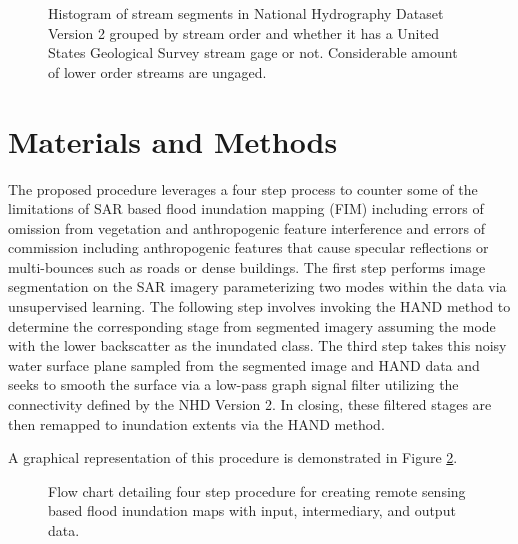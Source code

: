 \documentclass{article}
\begin{document}
\begin{figure}[htb]

\begin{minipage}[b]{1.0\linewidth}
  \centering
 \centerline{}
\end{minipage}

\caption{Histogram of stream segments in National Hydrography Dataset Version 2 grouped by stream order and whether it has a United States Geological Survey stream gage or not. Considerable amount of lower order streams are ungaged.}
\label{fig:histogram_gages}

\end{figure}

\section{Materials and Methods}
\label{sec:materials_and_methods}

The proposed procedure leverages a four step process to counter some of the limitations of SAR based flood inundation mapping (FIM) including errors of omission from vegetation and anthropogenic feature interference and errors of commission including anthropogenic features that cause specular reflections or multi-bounces such as roads or dense buildings.
The first step performs image segmentation on the SAR imagery parameterizing two modes within the data via unsupervised learning.
The following step involves invoking the HAND method to determine the corresponding stage from segmented imagery assuming the mode with the lower backscatter as the inundated class.
The third step takes this noisy water surface plane sampled from the segmented image and HAND data and seeks to smooth the surface via a low-pass graph signal filter utilizing the connectivity defined by the NHD Version 2.
In closing, these filtered stages are then remapped to inundation extents via the HAND method.

A graphical representation of this procedure is demonstrated in Figure \ref{fig:process_flowchart}.

\begin{figure}[htb]

\begin{minipage}[b]{1.0\linewidth}
  \centering
 \centerline{}
\end{minipage}

\caption{Flow chart detailing four step procedure for creating remote sensing based flood inundation maps with input, intermediary, and output data.}
\label{fig:process_flowchart}

\end{figure}
\end{document}

